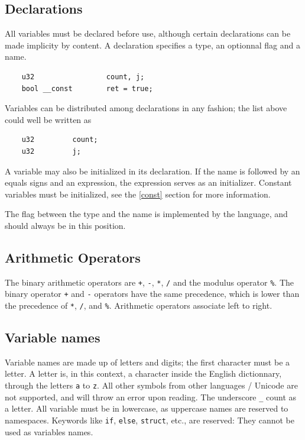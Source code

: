 \documentclass{scrartcl}
\begin{document}
        \subsection{Declarations}
            All variables must be declared before use, although certain
            declarations can be made implicity by content. A declaration
            specifies a type, an optionnal flag and a name.
            \begin{lstlisting}
    u32                 count, j;
    bool __const        ret = true;
            \end{lstlisting}
            Variables can be distributed among declarations in any fashion; the
            list above could well be written as
            \begin{lstlisting}
    u32         count;
    u32         j;
            \end{lstlisting}
            A variable may also be initialized in its declaration. If the name
            is followed by an equals signs and an expression, the expression
            serves as an initializer. Constant variables must be initialized,
            see the \ref{const} section for more information.

            The flag between the type and the name is implemented by the language,
            and should always be in this position.
        \subsection{Arithmetic Operators}
            The binary arithmetic operators are \texttt{+}, \texttt{-},
            \texttt{*}, \texttt{/} and the modulus operator \texttt{\%}.
            The binary operator \texttt{+} and \texttt{-} operators have the 
            same precedence, which is lower than the precedence of \texttt{*},
            \texttt{/}, and \texttt{\%}. Arithmetic operators associate left
            to right.

        \subsection{Variable names} \label{varnames}
            Variable names are made up of letters and digits; the first character
            must be a letter. A letter is, in this context, a character inside
            the English dictionnary, through the letters \texttt{a} to \texttt{z}.
            All other symbols from other languages / Unicode are not supported,
            and will throw an error upon reading. The underscore \texttt{\_}
            count as a letter. All variable must be in lowercase, as uppercase
            names are reserved to namespaces.
            Keywords like \texttt{if}, \texttt{else}, \texttt{struct}, etc., are
            reserved: They cannot be used as variables names.
\end{document}
